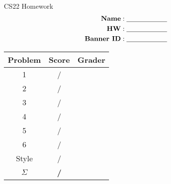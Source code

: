\documentclass[12pt,letterpaper]{article}
\begin{document}
\begin{center}

	{\huge CS22 Homework}\\
	{\Large
		\begin{align*}
		\text{\textbf{Name}}&: \text{\underline{\quad\quad\quad\quad\quad\quad}} \\
		\text{\textbf{HW}}&: \text{\underline{\quad\quad\quad\quad\quad\quad}} \\
		\text{\textbf{Banner ID}}&: \text{\underline{\quad\quad\quad\quad\quad\quad}}
		\end{align*}
	}
	
	{\Large
		\begin{tabular}{|c|c|c|}
			\hline
			\textbf{Problem} & \;\textbf{Score}\; & \;\textbf{Grader}\; \\\hline
			1 & / & ~ \quad\quad\\
			2 & / & ~ \quad\quad\\
			3 & / & ~ \quad\quad\\
			4 & / & ~ \quad\quad\\
			5 & / & ~ \quad\quad\\
			6 & / & ~ \quad\quad\\
			Style & / & ~ \quad\quad\\\hline
			$\Sigma$ & \textbf{/} & ~ \\
			\hline
		\end{tabular}
	}
\end{center}
\end{document}
